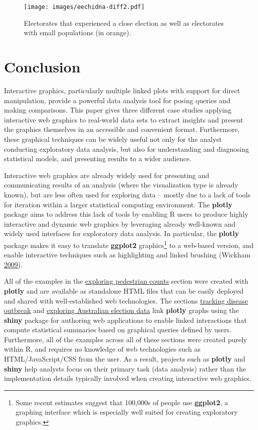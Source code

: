 \documentclass[12pt,]{isuthesis}
\let\rmarkdownfootnote\footnote%
\def\footnote{\protect\rmarkdownfootnote}
\begin{document}
\begin{figure}
\centering
\texttt{[image: images/eechidna-diff2.pdf]}
\caption{\label{fig:eechidna-diff2}Electorates that experienced a close
election as well as electorates with small populations (in orange).}
\end{figure}

\section{Conclusion}\label{conclusion-2}

Interactive graphics, particularly multiple linked plots with support
for direct manipulation, provide a powerful data analysis tool for
posing queries and making comparisons. This paper gives three different
case studies applying interactive web graphics to real-world data sets
to extract insights and present the graphics themselves in an accessible
and convenient format. Furthermore, these graphical techniques can be
widely useful not only for the analyst conducting exploratory data
analysis, but also for understanding and diagnosing statistical models,
and presenting results to a wider audience.

Interactive web graphics are already widely used for presenting and
communicating results of an analysis (where the visualization type is
already known), but are less often used for exploring data -- mostly due
to a lack of tools for iteration within a larger statistical computing
environment. The \textbf{plotly} package aims to address this lack of
tools by enabling R users to produce highly interactive and dynamic web
graphics by leveraging already well-known and widely used interfaces for
exploratory data analysis. In particular, the \textbf{plotly} package
makes it easy to translate \textbf{ggplot2} graphics\footnote{Some
  recent estimates suggest that 100,000s of people use \textbf{ggplot2},
  a graphing interface which is especially well suited for creating
  exploratory graphics.} to a web-based version, and enable interactive
techniques such as highlighting and linked brushing (Wickham
\protect\hyperlink{ref-ggplot2}{2009}).

All of the examples in the
\protect\hyperlink{exploring-pedestrian-counts}{exploring pedestrian
counts} section were created with \textbf{plotly} and are available as
standalone HTML files that can be easily deployed and shared with
well-established web technologies. The sections
\protect\hyperlink{tracking-disease-outbreak}{tracking disease outbreak}
and \protect\hyperlink{exploring-australian-election-data}{exploring
Australian election data} link \textbf{plotly} graphs using the
\textbf{shiny} package for authoring web applications to enable linked
interactions that compute statistical summaries based on graphical
queries defined by users. Furthermore, all of the examples across all of
these sections were created purely within R, and requires no knowledge
of web technologies such as HTML/JavaScript/CSS from the user. As a
result, projects such as \textbf{plotly} and \textbf{shiny} help
analysts focus on their primary task (data analysis) rather than the
implementation details typically involved when creating interactive web
graphics.
\end{document}
